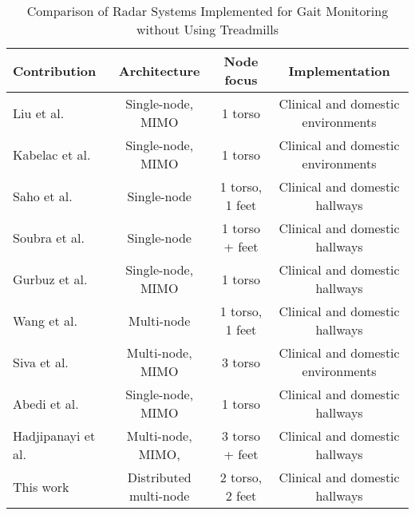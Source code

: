 \begin{table*}[htbp]
	\caption{Comparison of Radar Systems Implemented for Gait Monitoring without Using Treadmills}
	\begin{center}
		\begin{tabular}{lccc}
			\hline 
			\textbf{Contribution}				& \textbf{Architecture}				& \textbf{Node focus}& \textbf{Implementation}					\\
			\hline
			Liu et al. \cite{liu_2022}			& Single-node, MIMO 				& 1 torso				& Clinical and domestic environments		\\
			Kabelac et al. \cite{kabelac_2019}	& Single-node, MIMO					& 1 torso				& Clinical and domestic environments		\\
			Saho et al. \cite{saho_2022}	& Single-node						& 1 torso, 1 feet		& Clinical and domestic hallways							\\
			Soubra et al. \cite{soubra_2023}	& Single-node						& 1 torso + feet				& Clinical and domestic hallways							\\
			Gurbuz et al. \cite{gurbuz_2024}	& Single-node, MIMO 				& 1 torso				& Clinical and domestic hallways							\\
			Wang et al. \cite{wang_2014}		& Multi-node						& 1 torso, 1 feet		& Clinical and domestic hallways							\\
			Siva et al. \cite{siva_2024}		& Multi-node, MIMO 					& 3 torso				& Clinical and domestic environments		\\
			Abedi et al. \cite{abedi_2022}		& Single-node, MIMO 				& 1 torso				& Clinical and domestic hallways							\\
			Hadjipanayi et al. \cite{hadjipanayi_2024}		& Multi-node, MIMO, 	& 3 torso + feet				& Clinical and domestic hallways							\\
			This work							& Distributed multi-node			& 2 torso, 2 feet		& Clinical and domestic hallways 						\\ 
			\hline    
		\end{tabular}
		\label{tab:state_of_the_art}
	\end{center}
        \vspace{-0.5cm}
\end{table*}